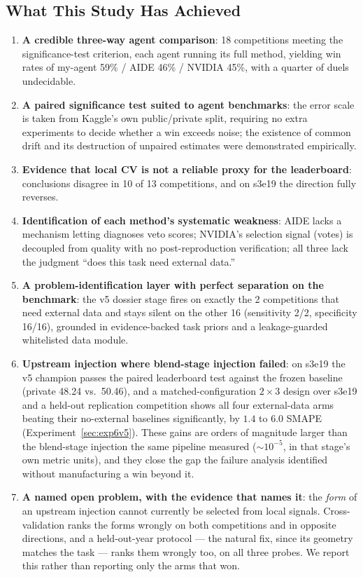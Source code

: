 \documentclass[11pt,a4paper]{article}
\begin{document}
\subsection{What This Study Has Achieved}

\begin{enumerate}[leftmargin=*]
  \item \textbf{A credible three-way agent comparison}: 18 competitions meeting the significance-test criterion, each agent running its full method, yielding win rates of my-agent 59\% / AIDE 46\% / NVIDIA 45\%, with a quarter of duels undecidable.
  \item \textbf{A paired significance test suited to agent benchmarks}: the error scale is taken from Kaggle's own public/private split, requiring no extra experiments to decide whether a win exceeds noise; the existence of common drift and its destruction of unpaired estimates were demonstrated empirically.
  \item \textbf{Evidence that local CV is not a reliable proxy for the leaderboard}: conclusions disagree in 10 of 13 competitions, and on s3e19 the direction fully reverses.
  \item \textbf{Identification of each method's systematic weakness}: AIDE lacks a mechanism letting diagnoses veto scores; NVIDIA's selection signal (votes) is decoupled from quality with no post-reproduction verification; all three lack the judgment ``does this task need external data.''
  \item \textbf{A problem-identification layer with perfect separation on the benchmark}: the v5 dossier stage fires on exactly the 2 competitions that need external data and stays silent on the other 16 (sensitivity 2/2, specificity 16/16), grounded in evidence-backed task priors and a leakage-guarded whitelisted data module.
  \item \textbf{Upstream injection where blend-stage injection failed}: on s3e19 the v5 champion passes the paired leaderboard test against the frozen baseline (private 48.24 vs.\ 50.46), and a matched-configuration $2\times3$ design over s3e19 and a held-out replication competition shows all four external-data arms beating their no-external baselines significantly, by $1.4$ to $6.0$ SMAPE (Experiment~\ref{sec:exp6v5}). These gains are orders of magnitude larger than the blend-stage injection the same pipeline measured (${\sim}10^{-5}$, in that stage's own metric units), and they close the gap the failure analysis identified without manufacturing a win beyond it.
  \item \textbf{A named open problem, with the evidence that names it}: the \emph{form} of an upstream injection cannot currently be selected from local signals. Cross-validation ranks the forms wrongly on both competitions and in opposite directions, and a held-out-year protocol --- the natural fix, since its geometry matches the task --- ranks them wrongly too, on all three probes. We report this rather than reporting only the arms that won.

\end{enumerate}
\end{document}
